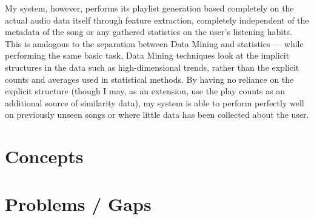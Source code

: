 My system, however, performs its playlist generation based completely on the actual audio data itself through feature extraction, completely independent of the metadata of the song or any gathered statistics on the user's listening habits. This is analogous to the separation between Data Mining and statistics --- while performing the same basic task, Data Mining techniques look at the implicit structures in the data such as high-dimensional trends, rather than the explicit counts and averages used in statistical methods. By having no reliance on the explicit structure (though I may, as an extension, use the play counts as an additional source of similarity data), my system is able to perform perfectly well on previously unseen songs or where little data has been collected about the user.
\section{Concepts}
\section{Problems / Gaps}

